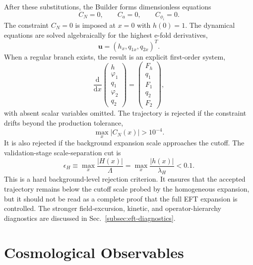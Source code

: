 \documentclass[aps,prd,twocolumn,superscriptaddress,nofootinbib,longbibliography]{revtex4-2}
\newcommand{\dd}{\mathrm{d}}
\newcommand{\Lam}{\Lambda}
\newcommand{\varphione}{\varphi_1}
\newcommand{\varphitwo}{\varphi_2}
\begin{document}
After these substitutions, the Builder forms dimensionless equations
\begin{equation}
C_N=0,\qquad C_a=0,\qquad C_{\phi_i}=0.
\end{equation}
The constraint $C_N=0$ is imposed at $x=0$ with $h(0)=1$.  The dynamical equations are solved algebraically for the highest e-fold derivatives,
\begin{equation}
\bm u=(h_x,q_{1x},q_{2x})^T.
\end{equation}
When a regular branch exists, the result is an explicit first-order system,
\begin{equation}
\frac{\dd}{\dd x}
\begin{pmatrix}
h\\ \varphione\\ q_1\\ \varphitwo\\ q_2
\end{pmatrix}
=
\begin{pmatrix}
F_h\\ q_1\\ F_1\\ q_2\\ F_2
\end{pmatrix},
\label{eq:first-order}
\end{equation}
with absent scalar variables omitted.  The trajectory is rejected if the constraint drifts beyond the production tolerance,
\begin{equation}
\max_x|C_N(x)|>10^{-4}.
\label{eq:constraint-cut}
\end{equation}
It is also rejected if the background expansion scale approaches the cutoff.  The validation-stage scale-separation cut is
\begin{equation}
\epsilon_H\equiv
\max_x\frac{|H(x)|}{\Lam}
=
\max_x\frac{|h(x)|}{\lambda_H}
<0.1 .
\label{eq:eft-cut}
\end{equation}
This is a hard background-level rejection criterion.  It ensures that the accepted trajectory remains below the cutoff scale probed by the homogeneous expansion, but it should not be read as a complete proof that the full EFT expansion is controlled.  The stronger field-excursion, kinetic, and operator-hierarchy diagnostics are discussed in Sec.~\ref{subsec:eft-diagnostics}.

\section{Cosmological Observables}
\label{sec:observables}
\end{document}
